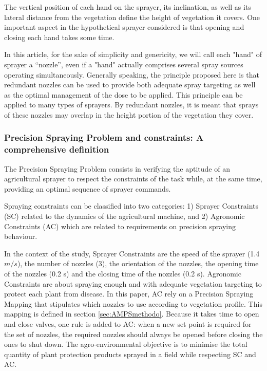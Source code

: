 \documentclass[preprint,3p,times,twocolumn]{elsarticle}
\begin{document}
The vertical position of each hand on the sprayer, its inclination, as well as its lateral distance from the vegetation define the height of vegetation it covers. One important aspect in the hypothetical sprayer considered is that opening and closing each hand takes some time.


In this article, for the sake of simplicity and genericity, we will call each "hand" of sprayer a “nozzle”, even if a "hand" actually comprises several spray sources operating simultaneously. Generally speaking, the principle proposed here is that redundant nozzles can be used to provide both adequate spray targeting as well as the optimal management of the dose to be applied. This principle can be applied to many types of sprayers. By redundant nozzles, it is meant that sprays of these nozzles may overlap in the height portion of the vegetation they cover.

\subsubsection{Precision Spraying Problem and constraints: A comprehensive definition}
\label{sec:Spraying_Constraints}

The Precision Spraying Problem consists in verifying the aptitude of an agricultural sprayer to respect the constraints of the task while, at the same time, providing an optimal sequence of sprayer commands. 

Spraying constraints can be classified into two categories: 1) Sprayer Constraints (SC) related to the dynamics of the agricultural machine, and 2) Agronomic Constraints (AC) which are related to requirements on precision spraying behaviour. 

In the context of the study, Sprayer Constraints are the speed of the sprayer (1.4 $m/s$), the number of nozzles (3), the orientation of the nozzles, the opening time of the nozzles (0.2 s) and the closing time of the nozzles (0.2 s). 
Agronomic Constraints are about spraying enough and with adequate vegetation targeting to protect each plant from disease. In this paper, AC rely on a Precision Spraying Mapping that stipulates which nozzles to use according to vegetation profile. This mapping is defined in section \ref{sec:AMPSmethodo}. Because it takes time to open and close valves, one rule is added to AC: when a new set point is required for the set of nozzles, the required nozzles should always be opened before closing the ones to shut down.
The agro-environmental objective is to minimise the total quantity of plant protection products sprayed in a field while respecting SC and AC.
\end{document}
